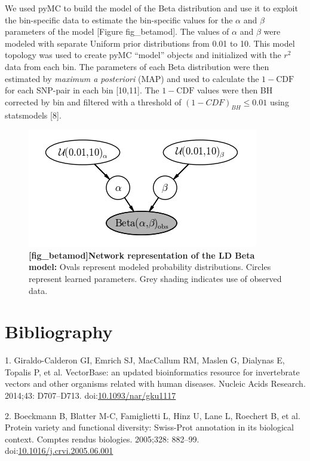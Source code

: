 \documentclass[letterpaper]{scrartcl}
\begin{document}
We used pyMC to build the model of the Beta distribution and use it to
exploit the bin-specific data to estimate the bin-specific values for
the \(\alpha\) and \(\beta\) parameters of the model {[}Figure
fig\_betamod{]}. The values of \(\alpha\) and \(\beta\) were modeled
with separate Uniform prior distributions from 0.01 to 10. This model
topology was used to create pyMC ``model'' objects and initialized with
the \(r^2\) data from each bin. The parameters of each Beta distribution
were then estimated by \emph{maximum a posteriori} (MAP) and used to
calculate the \(1-\mathrm{CDF}\) for each SNP-pair in each bin
{[}10,11{]}. The \(1-\mathrm{CDF}\) values were then BH corrected by bin
and filtered with a threshold of \((1-CDF)_{BH} \le 0.01\) using
statsmodels {[}8{]}.

\begin{figure}[htbp]
\centering
\includegraphics{../figures/bin_MAP_model.png}
\caption{\textbf{{[}fig\_betamod{]}Network representation of the LD Beta
model:} Ovals represent modeled probability distributions. Circles
represent learned parameters. Grey shading indicates use of observed
data. \label{fig_betamod}}
\end{figure}

\newpage

\section*{Bibliography}\label{bibliography}

1. Giraldo-Calderon GI, Emrich SJ, MacCallum RM, Maslen G, Dialynas E,
Topalis P, et al. VectorBase: an updated bioinformatics resource for
invertebrate vectors and other organisms related with human diseases.
Nucleic Acids Research. 2014;43: D707--D713.
doi:\href{http://dx.doi.org/10.1093/nar/gku1117}{10.1093/nar/gku1117}

2. Boeckmann B, Blatter M-C, Famiglietti L, Hinz U, Lane L, Roechert B,
et al. Protein variety and functional diversity: Swiss-Prot annotation
in its biological context. Comptes rendus biologies. 2005;328: 882--99.
doi:\href{http://dx.doi.org/10.1016/j.crvi.2005.06.001}{10.1016/j.crvi.2005.06.001}
\end{document}
